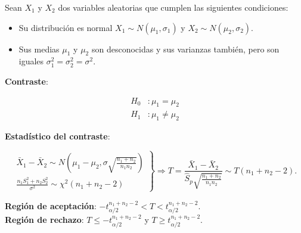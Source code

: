 \documentclass[
  a4paper,
]{scrreport}
\providecommand{\tightlist}{%
  \setlength{\itemsep}{0pt}\setlength{\parskip}{0pt}}\usepackage{longtable,booktabs,array}
\theoremstyle{plain}
\theoremstyle{definition}
\theoremstyle{definition}
\theoremstyle{remark}
\begin{document}
Sean \(X_1\) y \(X_2\) dos variables aleatorias que cumplen las
siguientes condiciones:

\begin{itemize}
\tightlist
\item
  Su distribución es normal \(X_1\sim N(\mu_1,\sigma_1)\) y
  \(X_2\sim N(\mu_2,\sigma_2)\).
\item
  Sus medias \(\mu_1\) y \(\mu_2\) son desconocidas y sus varianzas
  también, pero son iguales \(\sigma^2_1=\sigma^2_2=\sigma^2\).
\end{itemize}

\textbf{Contraste}:

\begin{align*}
H_0 &: \mu_1=\mu_2 \\
H_1 &: \mu_1\neq \mu_2
\end{align*}

\textbf{Estadístico del contraste}:

\[
\left.
\begin{array}{l}
\bar{X}_1-\bar{X}_2\sim N\left(\mu_1-\mu_2,\sigma\sqrt{\frac{n_1+n_2}{n_1n_2}} \right) \\
\displaystyle \frac{n_1S_1^2+n_2S_2^2}{\sigma^2} \sim \chi^2(n_1+n_2-2)
\end{array}
\right\}
\Rightarrow
T=\frac{\bar{X}_1-\bar{X}_2}{\hat{S}_p\sqrt{\frac{n_1+n_2}{n_1n_2}}} \sim T(n_1+n_2-2).
\]

\textbf{Región de aceptación}:
\(-t_{\alpha/2}^{n_1+n_2-2} < T < t_{\alpha/2}^{n_1+n_2-2}\).\\
\textbf{Región de rechazo}: \(T\leq -t_{\alpha/2}^{n_1+n_2-2}\) y
\(T\geq t_{\alpha/2}^{n_1+n_2-2}\).
\end{document}
